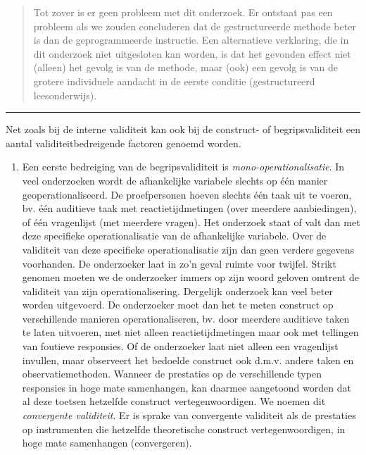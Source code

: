 \documentclass[
]{book}
\providecommand{\tightlist}{%
  \setlength{\itemsep}{0pt}\setlength{\parskip}{0pt}}
\begin{document}
\begin{quote}
Tot zover is er geen probleem met dit onderzoek. Er ontstaat pas een
probleem als we zouden concluderen dat de gestructureerde methode beter
is dan de geprogrammeerde instructie. Een alternatieve verklaring, die
in dit onderzoek niet uitgesloten kan worden, is dat het gevonden effect
niet (alleen) het gevolg is van de methode, maar (ook) een gevolg is van
de grotere individuele aandacht in de eerste conditie (gestructureerd
leesonderwijs).
\end{quote}

\begin{center}\rule{0.5\linewidth}{0.5pt}\end{center}

Net zoals bij de interne validiteit kan ook bij de construct- of
begripsvaliditeit een aantal validiteitbedreigende factoren genoemd
worden.

\begin{enumerate}
\def\labelenumi{\arabic{enumi}.}
\tightlist
\item
  Een eerste bedreiging van de begripsvaliditeit is
  \emph{mono-operationalisatie}. In veel onderzoeken wordt de afhankelijke
  variabele slechts op één manier geoperationaliseerd. De proefpersonen
  hoeven slechts één taak uit te voeren, bv. één auditieve taak met
  reactietijdmetingen (over meerdere aanbiedingen), of één vragenlijst
  (met meerdere vragen). Het onderzoek staat of valt dan met deze
  specifieke operationalisatie van de afhankelijke variabele. Over de
  validiteit van deze specifieke operationalisatie zijn dan geen verdere
  gegevens voorhanden. De onderzoeker laat in zo'n geval ruimte voor
  twijfel. Strikt genomen moeten we de onderzoeker immers op zijn woord
  geloven omtrent de validiteit van zijn operationalisering. Dergelijk
  onderzoek kan veel beter worden uitgevoerd. De onderzoeker moet dan het
  te meten construct op verschillende manieren operationaliseren, bv. door
  meerdere auditieve taken te laten uitvoeren, met niet alleen
  reactietijdmetingen maar ook met tellingen van foutieve responsies. Of
  de onderzoeker laat niet alleen een vragenlijst invullen, maar
  observeert het bedoelde construct ook d.m.v. andere taken en
  observatiemethoden. Wanneer de prestaties op de verschillende typen
  responsies in hoge mate samenhangen, kan daarmee aangetoond worden dat
  al deze toetsen hetzelfde construct vertegenwoordigen. We noemen dit
  \emph{convergente validiteit}. Er is sprake van convergente validiteit als de
  prestaties op instrumenten die hetzelfde theoretische construct
  vertegenwoordigen, in hoge mate samenhangen (convergeren).
\end{enumerate}
\end{document}

